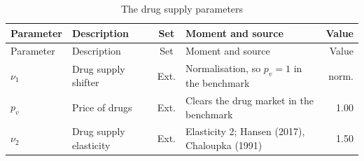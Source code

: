 \setlength{\tabcolsep}{3pt}
\begingroup\scriptsize
\begin{longtable}{@{}lL{4.3cm}cL{6.6cm}r@{}}
\caption{\normalsize The drug supply parameters}\label{tab:paperparams}\\
\toprule
Parameter& Description& Set& Moment and source& Value \\
\midrule
\endfirsthead
\toprule
Parameter& Description& Set& Moment and source& Value \\
\midrule
\endhead
$\nu_1$& Drug supply shifter& Ext.& Normalisation, so $p_v=1$ in the benchmark& norm. \\
$p_v$& Price of drugs& Ext.& Clears the drug market in the benchmark& 1.00 \\
$\nu_2$ & Drug supply elasticity & Ext. & Elasticity 2; Hansen (2017), Chaloupka (1991) & 1.50 \\
\bottomrule
\end{longtable}\endgroup

